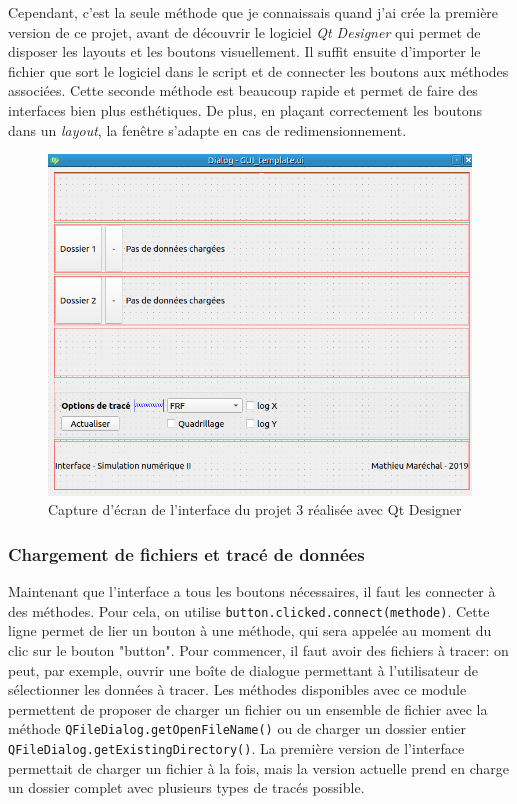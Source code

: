 \documentclass[a4paper,11pt]{article}
\begin{document}
Cependant, c'est la seule méthode que je connaissais quand j'ai crée la première version de ce projet, avant de découvrir le logiciel \textit{Qt Designer} qui permet de disposer les layouts et les boutons visuellement. Il suffit ensuite d'importer le fichier que sort le logiciel dans le script et de connecter les boutons aux méthodes associées. Cette seconde méthode est beaucoup rapide et permet de faire des interfaces bien plus esthétiques. De plus, en plaçant correctement les boutons dans un \textit{layout}, la fenêtre s'adapte en cas de redimensionnement.

\begin{figure}[H]
	\centering
	\includegraphics[scale=0.3]{Figures/interf_qt.png}
	\caption{Capture d'écran de l'interface du projet 3 réalisée avec Qt Designer}
	\label{fig:interf_qt} 
\end{figure}

\subsubsection{Chargement de fichiers et tracé de données}

Maintenant que l'interface a tous les boutons nécessaires, il faut les connecter à des méthodes. Pour cela, on utilise \verb|button.clicked.connect(methode)|. Cette ligne permet de lier un bouton à une méthode, qui sera appelée au moment du clic sur le bouton "button". Pour commencer, il faut avoir des fichiers à tracer: on peut, par exemple, ouvrir une boîte de dialogue permettant à l'utilisateur de sélectionner les données à tracer. Les méthodes disponibles avec ce module permettent de proposer de charger un fichier ou un ensemble de fichier avec la méthode \verb|QFileDialog.getOpenFileName()| ou de charger un dossier entier \verb|QFileDialog.getExistingDirectory()|. La première version de l'interface permettait de charger un fichier à la fois, mais la version actuelle prend en charge un dossier complet avec plusieurs types de tracés possible. 
\end{document}
